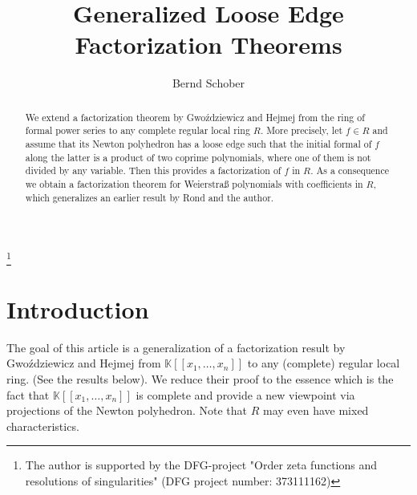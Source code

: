 \documentclass[11pt]{amsart}
\theoremstyle{plain}
\theoremstyle{definition}
\numberwithin{equation}{section}
\newcommand{\KK}{{\mathbb K}}
\renewcommand{\(}{(\!(}
\renewcommand{\)}{)\!)}
\begin{document}
 \author{Bernd Schober}
\address{Bernd Schober\\
Institut f\"ur Algebraische Geometrie\\
Leibniz Universit\"at Hannover\\
Welfengarten 1\\
30167 Hannover\\
Germany}

\title{Generalized Loose Edge Factorization Theorems}


\begin{abstract}
	We extend a factorization theorem by Gwo\'zdziewicz and Hejmej from the ring of formal power series to any complete regular local ring $ R $. 
	More precisely, let $ f \in R $
	and assume that its Newton polyhedron has a loose edge such that the initial formal of $ f $ along the latter is a product of two coprime polynomials,
	where one of them is not divided by any variable.
	Then this provides a factorization of $ f $ in $ R $. 
	As a consequence we obtain a factorization theorem for Weierstra{\ss} polynomials with coefficients in $ R $,
	which generalizes an earlier result by Rond and the author.
\end{abstract}



\thanks{The author is supported by the DFG-project "Order zeta functions and resolutions of singularities" (DFG project number: 373111162)}



\maketitle


\section{Introduction}
The goal of this article is a generalization of a factorization result by Gwo\'zdziewicz and Hejmej 
from $ \KK[[x_1, \ldots, x_n]] $ to any (complete) regular local ring.
(See the results below).
We reduce their proof to the essence which is the fact that 
$ \KK[[x_1, \ldots, x_n]] $ is complete
and provide a new viewpoint via projections of the Newton polyhedron.
Note that $ R $ may even have mixed characteristics.
\end{document}
